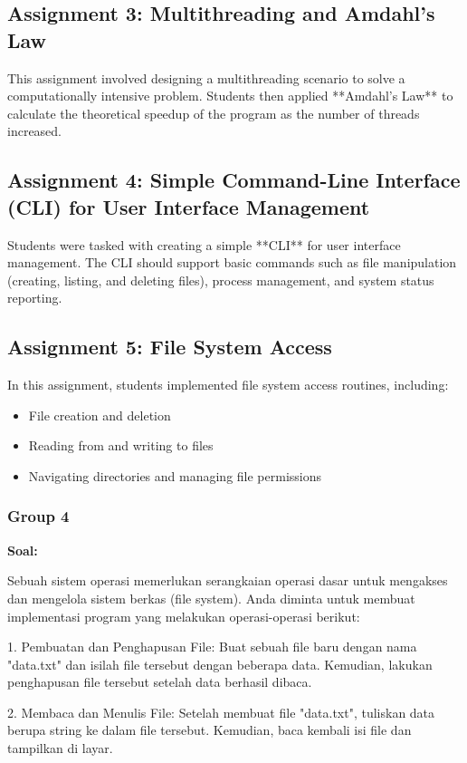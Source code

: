 \documentclass[12pt]{article}
\begin{document}
\subsection{Assignment 3: Multithreading and Amdahl's Law}
This assignment involved designing a multithreading scenario to solve a computationally intensive problem. Students then applied **Amdahl's Law** to calculate the theoretical speedup of the program as the number of threads increased.

\subsection{Assignment 4: Simple Command-Line Interface (CLI) for User Interface Management}
Students were tasked with creating a simple **CLI** for user interface management. The CLI should support basic commands such as file manipulation (creating, listing, and deleting files), process management, and system status reporting.

\subsection{Assignment 5: File System Access}
In this assignment, students implemented file system access routines, including:
\begin{itemize}
    \item File creation and deletion
    \item Reading from and writing to files
    \item Navigating directories and managing file permissions
\end{itemize}
\subsubsection{Group 4}
\textbf{Soal:}

Sebuah sistem operasi memerlukan serangkaian operasi dasar untuk mengakses dan mengelola sistem berkas (file system). Anda diminta untuk membuat implementasi program yang melakukan operasi-operasi berikut:

1. Pembuatan dan Penghapusan File: Buat sebuah file baru dengan nama "data.txt" dan isilah file tersebut dengan beberapa data. Kemudian, lakukan penghapusan file tersebut setelah data berhasil dibaca.

2. Membaca dan Menulis File: Setelah membuat file "data.txt", tuliskan data berupa string ke dalam file tersebut. Kemudian, baca kembali isi file dan tampilkan di layar.
\end{document}
